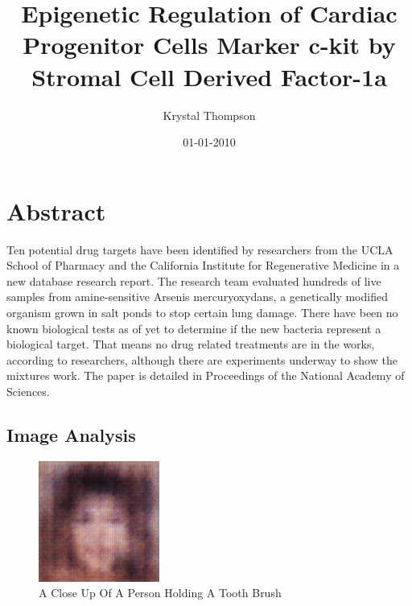 \documentclass{article}%
\title{Epigenetic Regulation of Cardiac Progenitor Cells Marker c{-}kit by Stromal Cell Derived Factor{-}1a}%
\author{Krystal Thompson}%
\affil{Department of Comparative Physiology, Uppsala University, Uppsala, Sweden}%
\date{01{-}01{-}2010}%
\begin{document}
%
\normalsize%
\maketitle%
\section{Abstract}%
\label{sec:Abstract}%
Ten potential drug targets have been identified by researchers from the UCLA School of Pharmacy and the California Institute for Regenerative Medicine in a new database research report.\newline%
The research team evaluated hundreds of live samples from amine{-}sensitive Arsenis mercuryoxydans, a genetically modified organism grown in salt ponds to stop certain lung damage.\newline%
There have been no known biological tests as of yet to determine if the new bacteria represent a biological target.\newline%
That means no drug related treatments are in the works, according to researchers, although there are experiments underway to show the mixtures work.\newline%
The paper is detailed in Proceedings of the National Academy of Sciences.

%
\subsection{Image Analysis}%
\label{subsec:ImageAnalysis}%


\begin{figure}[h!]%
\centering%
\includegraphics[width=150px]{500_fake_images/samples_5_211.png}%
\caption{A Close Up Of A Person Holding A Tooth Brush}%
\end{figure}

%
\end{document}
